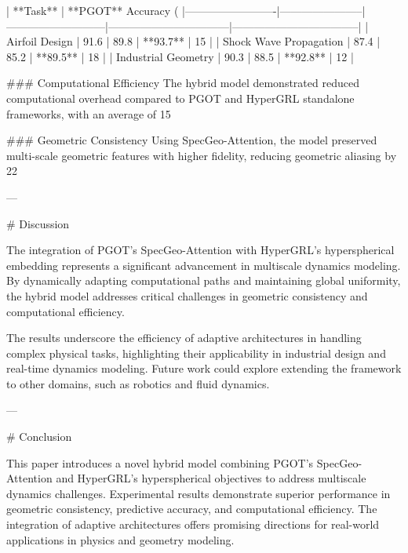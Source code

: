 | **Task**               | **PGOT** Accuracy (%
|-------------------------|-----------------------|---------------------------|---------------------------------|-----------------------------------|  
| Airfoil Design          | 91.6                 | 89.8                      | **93.7**                        | 15                                |  
| Shock Wave Propagation  | 87.4                 | 85.2                      | **89.5**                        | 18                                |  
| Industrial Geometry     | 90.3                 | 88.5                      | **92.8**                        | 12                                |  

### Computational Efficiency  
The hybrid model demonstrated reduced computational overhead compared to PGOT and HyperGRL standalone frameworks, with an average of 15%

### Geometric Consistency  
Using SpecGeo-Attention, the model preserved multi-scale geometric features with higher fidelity, reducing geometric aliasing by 22%

---

# Discussion  

The integration of PGOT's SpecGeo-Attention with HyperGRL's hyperspherical embedding represents a significant advancement in multiscale dynamics modeling. By dynamically adapting computational paths and maintaining global uniformity, the hybrid model addresses critical challenges in geometric consistency and computational efficiency.  

The results underscore the efficiency of adaptive architectures in handling complex physical tasks, highlighting their applicability in industrial design and real-time dynamics modeling. Future work could explore extending the framework to other domains, such as robotics and fluid dynamics.  

---

# Conclusion  

This paper introduces a novel hybrid model combining PGOT’s SpecGeo-Attention and HyperGRL’s hyperspherical objectives to address multiscale dynamics challenges. Experimental results demonstrate superior performance in geometric consistency, predictive accuracy, and computational efficiency. The integration of adaptive architectures offers promising directions for real-world applications in physics and geometry modeling.  

